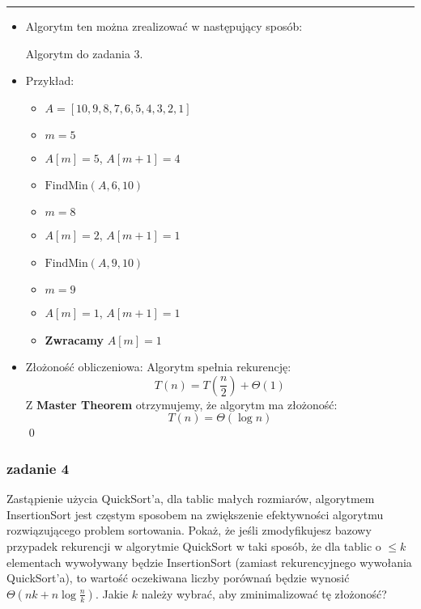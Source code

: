 \documentclass[11pt,a4paper]{article}
\begin{document}
\bigskip
\hrule
\bigskip

\begin{itemize}
    \item Algorytm ten można zrealizować w następujący sposób:
        \begin{algorithm}
            \caption{Algorytm do zadania 3.}
            \begin{algorithmic}[1]
                \State {}
                \EndIf
                \State {}
                \Else
                \State {}
                \EndIf
                \EndProcedure
            \end{algorithmic}
        \end{algorithm}
    \item Przykład:
        \begin{itemize}
            \item $A = [10, 9, 8, 7, 6, 5, 4, 3, 2, 1]$
            \item $m = 5$
            \item $A[m] = 5$, $A[m+1] = 4$
            \item $\text{FindMin}(A, 6, 10)$
            \item $m = 8$
            \item $A[m] = 2$, $A[m+1] = 1$
            \item $\text{FindMin}(A, 9, 10)$
            \item $m = 9$
            \item $A[m] = 1$, $A[m+1] = 1$
            \item \textbf{Zwracamy} $A[m] = 1$
        \end{itemize}
    \item Złożoność obliczeniowa: Algorytm spełnia rekurencję:
        \[
            T(n) = T\left(\frac{n}{2}\right) + \Theta(1)
        \]
        Z \textbf{Master Theorem} otrzymujemy, że algorytm ma złożoność:
        \[
            T(n) = \Theta(\log n)
        \]
        \qed
\end{itemize}

\subsubsection{zadanie 4}
Zastąpienie użycia QuickSort'a, dla tablic małych rozmiarów, algorytmem InsertionSort jest częstym sposobem na zwiększenie efektywności algorytmu rozwiązującego problem sortowania. Pokaż, że jeśli zmodyfikujesz bazowy przypadek rekurencji w algorytmie QuickSort w taki sposób, że dla tablic o $\leq k$ elementach wywoływany będzie InsertionSort (zamiast rekurencyjnego wywołania QuickSort'a), to wartość oczekiwana liczby porównań będzie wynosić $\Theta\left(nk + n \log \frac{n}{k}\right)$. Jakie $k$ należy wybrać, aby zminimalizować tę złożoność?
\end{document}
